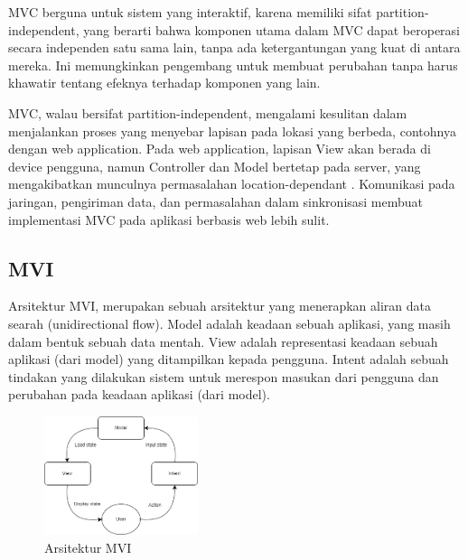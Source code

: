 \documentclass[conference]{IEEEtran}
\begin{document}
MVC berguna untuk sistem yang interaktif, karena memiliki sifat partition-independent, yang berarti bahwa komponen utama dalam MVC dapat beroperasi secara independen satu sama lain, tanpa ada ketergantungan yang kuat di antara mereka. Ini memungkinkan pengembang untuk membuat perubahan tanpa harus khawatir tentang efeknya terhadap komponen yang lain.

MVC, walau bersifat partition-independent, mengalami kesulitan dalam menjalankan proses yang menyebar lapisan pada lokasi yang berbeda, contohnya dengan web application. Pada web application, lapisan View akan berada di device pengguna, namun Controller dan Model bertetap pada server, yang mengakibatkan munculnya permasalahan location-dependant \cite{leff2001web}. Komunikasi pada jaringan, pengiriman data, dan permasalahan dalam sinkronisasi membuat implementasi MVC pada aplikasi berbasis web lebih sulit.


\subsection{MVI}
Arsitektur  MVI,  merupakan  sebuah  arsitektur  yang  menerapkan  aliran  data  searah (unidirectional flow). Model adalah keadaan sebuah aplikasi, yang masih dalam bentuk sebuah data mentah. View adalah representasi keadaan sebuah aplikasi (dari model) yang ditampilkan kepada  pengguna.  Intent  adalah  sebuah  tindakan  yang  dilakukan  sistem  untuk  merespon masukan dari pengguna  dan  perubahan  pada  keadaan  aplikasi  (dari  model). 

\begin{figure}[h]
    \centering
    \includegraphics[width = 0.4\textwidth]{images/MVI1.png}
    \caption{Arsitektur MVI}
    \label{fig:enter-label}
\end{figure}
\end{document}
